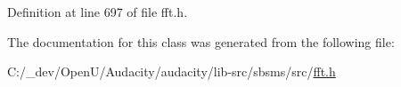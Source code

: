 Definition at line 697 of file fft.\+h.



The documentation for this class was generated from the following file\+:\begin{DoxyCompactItemize}
\item 
C\+:/\+\_\+dev/\+Open\+U/\+Audacity/audacity/lib-\/src/sbsms/src/\hyperlink{lib-src_2sbsms_2src_2fft_8h}{fft.\+h}\end{DoxyCompactItemize}
